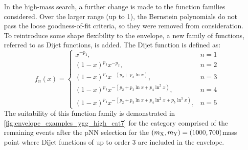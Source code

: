 In the high-mass \XYggHtt search, a further change is made to the function families considered. Over the larger \mgg range (up to 1\TeV), the Bernstein polynomials do not pass the loose goodness-of-fit criteria, so they were removed from consideration. To reintroduce some shape flexibility to the envelope, a new family of functions, referred to as Dijet functions, is added. The Dijet function is defined as:
\begin{equation}
  f_n(x) =
  \begin{cases}
      x^{-p_1}, & n = 1 \\
      (1 - x)^{p_1} x^{-p_2}, & n = 2 \\
      (1 - x)^{p_1} x^{- (p_2 + p_3 \ln x)}, & n = 3 \\
      (1 - x)^{p_1} x^{- (p_2 + p_3 \ln x + p_4 \ln^2 x)}, & n = 4 \\
      (1 - x)^{p_1} x^{- (p_2 + p_3 \ln x + p_4 \ln^2 x + p_5 \ln^3 x)}, & n = 5
  \end{cases}
\end{equation}
The suitability of this function family is demonstrated in \cref{fig:envelope_examples_ygg_high_cat7} for the category comprised of the remaining events after the pNN selection for the $(m_{\mathrm{X}},m_{\mathrm{Y}}) = (1000,700)$\GeV mass point where Dijet functions of up to order 3 are included in the envelope. 

